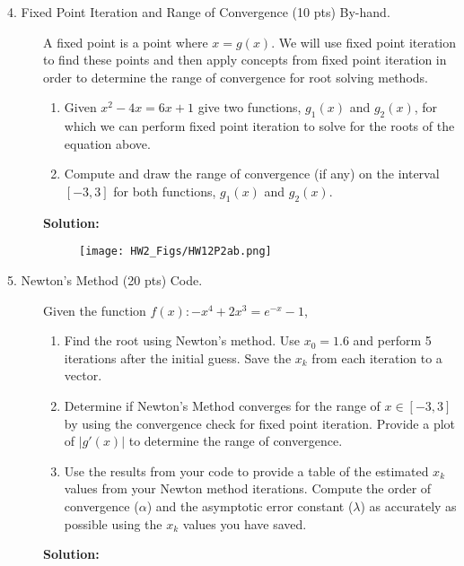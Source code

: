\documentclass[12pt]{article}
\begin{document}
\begin{description}
		\item[4. Fixed Point Iteration and Range of Convergence (10 pts) By-hand.] A fixed point is a point where $x = g (x)$. We will use fixed point iteration to find these points and then apply concepts from fixed point iteration in order to determine the range of convergence for root solving methods.
		\begin{enumerate} [label=(\alph*)]
			\item Given $x^2 -4x = 6x + 1$ give two functions, $g_1 (x)$ and $g_2 (x)$, for which we can perform fixed point iteration to solve for the roots of the equation above.
			\item Compute and draw the range of convergence (if any) on the interval $[-3,3]$ for both functions, $g_1 (x)$ and $g_2 (x)$.
		\end{enumerate}
		
		\ifsolution
		\color{red}
		{\bf Solution:}\\
		\begin{figure}[ht]
			\centering\texttt{[image: HW2\_Figs/HW12P2ab.png]}
			\label{fig:5ab}
		\end{figure}
		\color{black}
		\fi
		
		
		\item[5. Newton's Method (20 pts) Code.] Given the function $f(x): -x^4 + 2x^3 = e^{-x} - 1$,
		\begin{enumerate} [label=(\alph*)]
			\item Find the root using Newton's method. Use $x_0 = 1.6$ and perform 5 iterations after the initial guess. Save the $x_k$ from each iteration to a vector.
			\item 	Determine if Newton's Method converges for the range of $x \in [-3,3]$ by using the convergence check for fixed point iteration. Provide a plot of $|g'(x)|$ to determine the range of convergence.
			\item Use the results from your code to provide a table of the estimated $x_k$ values from your Newton method iterations. Compute the order of convergence ($\alpha$) and the asymptotic error constant ($\lambda$) as accurately as possible using the $x_k$ values you have saved.
		\end{enumerate}
		
		\ifsolution
		\color{red}
		{\bf Solution:}\\
		\begin{enumerate} [label=(\alph*)]
			

\end{enumerate}
\end{description}
\end{document}
